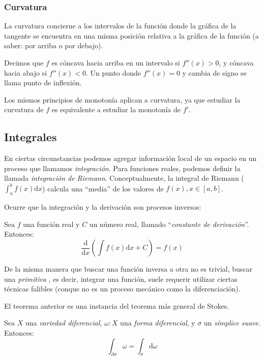 \documentclass[10pt]{article}
\newcommand{\diff}{\mathrm{d}}
\begin{document}
\subsubsection{Curvatura}

La curvatura concierne a los intervalos de la función donde la gráfica de la tangente se encuentra en una misma posición relativa a la gráfica de la función (a saber: por arriba o por debajo).

\begin{definition}
  Decimos que $f$ es cóncava hacia arriba en un intervalo si $f''(x) > 0$,
  y cóncava hacia abajo si $f''(x) < 0$.
  Un punto donde $f''(x)=0$ y cambia de signo se llama punto de inflexión.
\end{definition}

Los mismos principios de monotonía aplican a curvatura, ya que estudiar la curvatura de $ f $ es equivalente a estudiar la monotonía de $ f' $.

\subsection{Integrales}

En ciertas circunstancias podemos agregar información local de un espacio en un proceso que llamamos \textit{integración}. Para funciones reales, podemos definir la llamada \textit{integración de 
Riemann}. Conceptualmente, la integral de Riemann ($ \int_a^b f(x) \diff x $) calcula una ``media'' de los valores de $ f(x), x \in \left[a, b\right] $.

Ocurre que la integración y la derivación son procesos inversos:

\begin{theorem}
  Sea $ f $ una función real y $ C $ un número real, llamado ``\textit{constante de derivación}''. Entonces:
  \[ \frac{\diff}{\diff x} \left(\int f(x) \diff x + C\right) = f(x) \]
\end{theorem}

De la misma manera que buscar una función inversa a otra no es trivial, buscar una \textit{primitiva} , es decir, integrar una función, suele requerir utilizar ciertas técnicas falibles (conque no es un proceso mecánico como la diferenciación).

El teorema anterior es una instancia del teorema más general de Stokes.

\begin{theorem}
  Sea  $ X $ una \textit{variedad diferencial}, $ \omega : X $ una \textit{forma diferencial}, y $ \sigma $ un \textit{símplice suave}. Entonces:
  \[ \int_{\partial \sigma} \omega = \int_\sigma \diff \omega \]
\end{theorem}
\end{document}
